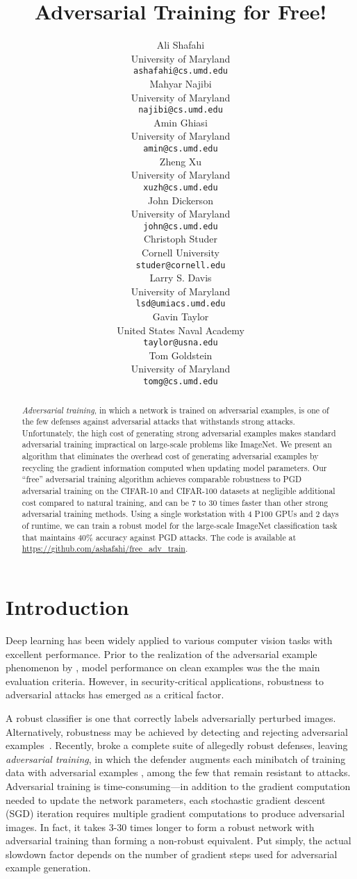 \documentclass{article}
\title{Adversarial Training for Free!}
\author{
  Ali Shafahi\\
  University of Maryland\\
  \texttt{ashafahi@cs.umd.edu}\\
  \And
  Mahyar Najibi\\
  University of Maryland\\
  \texttt{najibi@cs.umd.edu}\\
  \And
  Amin Ghiasi\\
  University of Maryland\\
  \texttt{amin@cs.umd.edu}\\
  \AND
  Zheng Xu\\
  University of Maryland\\
  \texttt{xuzh@cs.umd.edu}\\
  \And
    John Dickerson\\
  University of Maryland\\
  \texttt{john@cs.umd.edu}\\
  \And
    Christoph Studer\\
  Cornell University\\
  \texttt{studer@cornell.edu}\\
  \And
    Larry S. Davis\\
  University of Maryland\\
  \texttt{lsd@umiacs.umd.edu}\\
  \And
    Gavin Taylor\\
  United States Naval Academy\\
  \texttt{taylor@usna.edu}\\
  \And
  Tom Goldstein\\
  University of Maryland\\
  \texttt{tomg@cs.umd.edu}\\
}
\begin{document}
\def\bbE{\mathbb{E}}


\maketitle

\begin{abstract}

{\em Adversarial training}, in which a network is trained on adversarial examples, is one of the few defenses against adversarial attacks that withstands strong attacks.
Unfortunately, the high cost of generating strong adversarial examples makes standard adversarial training impractical on large-scale problems like ImageNet. 
We present an algorithm that eliminates the overhead cost of generating adversarial examples by recycling the gradient information computed when updating model parameters.  
Our ``free'' adversarial training algorithm achieves comparable robustness to PGD adversarial training on the CIFAR-10 and CIFAR-100 datasets at negligible additional cost compared to natural training, and can be 7 to 30 times faster than other strong adversarial training methods.
Using a single workstation with 4 P100 GPUs and 2 days of runtime, we can train a robust model for the large-scale ImageNet classification task that maintains 40\% accuracy against PGD attacks. The code is available at \url{https://github.com/ashafahi/free_adv_train}.
\end{abstract}

\section{Introduction}
Deep learning has been widely applied to various computer vision tasks with excellent performance. Prior to the realization of the adversarial example phenomenon by \cite{biggio2013evasion,szegedy2013intriguing}, model performance on clean examples was the the main evaluation criteria. However, in security-critical applications, robustness to adversarial attacks has emerged as a critical factor.

A robust classifier is one that correctly labels adversarially perturbed images. Alternatively, robustness may be achieved by detecting and rejecting adversarial examples~\citep{ma2018characterizing,meng2017magnet,xu2017feature}. 
Recently, \cite{athalye2018obfuscated} broke a complete suite of allegedly robust defenses, leaving {\em adversarial training}, in which the defender augments each minibatch of training data with adversarial examples \citep{madry2017towards}, among the few that remain resistant to attacks. Adversarial training is time-consuming---in addition to the gradient computation needed to update the network parameters, each stochastic gradient descent (SGD) iteration requires multiple gradient computations to produce adversarial images. In fact, it takes 3-30 times longer to form a robust network with adversarial training than forming a non-robust equivalent. Put simply, the actual slowdown factor depends on the number of gradient steps used for adversarial example generation. 
\end{document}
